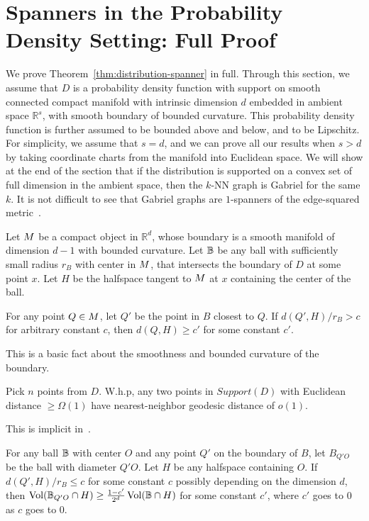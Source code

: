 \section{Spanners in the Probability Density Setting: Full
  Proof}\label{ap:distribution-spanner}

We prove Theorem~\ref{thm:distribution-spanner} in full.
Through this section, we assume that $D$ is a probability density
function with support on smooth connected compact manifold with intrinsic dimension
$d$ embedded in ambient space $\mathbb{R}^s$, 
with smooth boundary of bounded curvature. This
probability density function is further assumed to be bounded
above and below, and to be Lipschitz. For simplicity, we assume that
$s=d$, and we can prove all our results when $s > d$ by taking
coordinate charts from the manifold into Euclidean space.  We
will show at the end of the section that if the distribution is
supported on a convex set of full dimension in the ambient space,
then the $k$-NN graph is Gabriel for the same $k$. It is not
difficult to see that Gabriel graphs are $1$-spanners of the
edge-squared metric~\cite{SridharMaster}.

\begin{lemma}
  Let $M$ be a compact object in $\mathbb{R}^d$, whose
  boundary is a smooth manifold of dimension $d-1$ with bounded
  curvature.
  Let $\mathbb{B}$ be any ball with sufficiently small radius
  $r_B$ with center in $M$, that intersects the boundary of $D$
  at some point $x$.
  Let $H$ be the halfspace tangent to $M$ at $x$ containing the center
  of the ball.

For any point $Q \in M$, let $Q'$ be the point in $B$
closest to $Q$. If $d(Q', H) / r_B > c$ for arbitrary constant $c$,
then $d(Q, H) \geq c'$ for some constant $c'$.
\end{lemma}

This is a basic fact about the smoothness and bounded curvature
of the boundary.

\begin{lemma} Pick $n$ points from $D$. W.h.p, any two points in
  $Support(D)$ with Euclidean distance $ \geq \Omega(1)$ 
  have nearest-neighbor geodesic distance of $o(1)$.
\end{lemma}

This is implicit in~\cite{hwang2016}.
\begin{lemma} For any ball $\mathbb{B}$ with center $O$ and any point $Q'$ on the
  boundary of $B$, let $B_{Q'O}$ be the ball with diameter $Q'O$.
  Let $H$ be any halfspace containing $O$.
  If $d(Q', H) / r_B \leq c$ for some constant
  $c$ possibly depending on the dimension $d$, then
  $\operatorname{Vol}(\mathbb{B}_{Q'O} \cap H) \geq \frac{1-c'}{2^d} \operatorname{Vol}(\mathbb{B} \cap H)$
  for some
  constant $c'$, where $c'$ goes to $0$ as $c$ goes to $0$.
\end{lemma}


